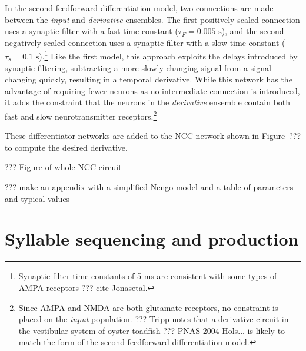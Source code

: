 In the second feedforward differentiation model,
two connections are made between
the \textit{input} and \textit{derivative} ensembles.
The first positively scaled connection
uses a synaptic filter with a fast time constant
($\tau_F=0.005 \text{ s}$),
and the second negatively scaled connection
uses a synaptic filter with a slow time constant
($\tau_s=0.1 \text{ s}$).\footnote{
  Synaptic filter time constants of 5 ms
  are consistent with some types of
  AMPA receptors ??? cite Jonasetal.}
Like the first model,
this approach exploits the delays introduced
by synaptic filtering,
subtracting a more slowly changing signal
from a signal changing quickly,
resulting in a temporal derivative.
While this network has the advantage
of requiring fewer neurons
as no intermediate connection is introduced,
it adds the constraint that
the neurons in the \textit{derivative} ensemble
contain both fast and slow
neurotransmitter receptors.\footnote{
  Since AMPA and NMDA are both glutamate receptors,
  no constraint is placed on the \textit{input} population.
  ??? Tripp notes that a derivative circuit
  in the vestibular system of oyster toadfish
  ??? PNAS-2004-Hols...
  is likely to match the form of the second
  feedforward differentiation model.}

These differentiator networks
are added to the NCC network
shown in Figure~???
to compute the desired derivative.

??? Figure of whole NCC circuit


??? make an appendix with a simplified Nengo model
and a table of parameters and typical values

\section{Syllable sequencing and production}


